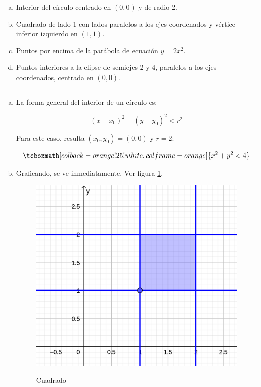 \documentclass{article}
\begin{document}
\begin{enumerate}[(a)]
\bfseries
\item Interior del círculo centrado en $(0, 0)$ y de radio 2.

\item Cuadrado de lado 1 con lados paralelos a los ejes coordenados y vértice inferior izquierdo en $(1, 1)$.

\item Puntos por encima de la parábola de ecuación $y = 2x^2$.

\item Puntos interiores a la elipse de semiejes 2 y 4, paralelos a los ejes coordenados, centrada en $(0, 0)$.

\end{enumerate}
\hrule

\begin{enumerate}[(a)]
\item La forma general del interior de un círculo es:

\begin{equation}
(x-x_0)^2 + (y-y_0)^2 < r^2
\end{equation}

Para este caso, resulta $(x_0, y_0) = (0, 0)$ y $r=2$:

\begin{equation}
\tcboxmath[colback=orange!25!white,colframe=orange]
{ x^2 + y^2 < 4 }
\end{equation}

\item Graficando, se ve inmediatamente. Ver figura \ref{fig:1-12-b}.

\begin{figure}[ht]
\caption{Cuadrado}
\includegraphics[scale=1.4]{img/ejercicios/1/12-b.png} 
\centering
\label{fig:1-12-b}
\end{figure}


\end{enumerate}
\end{document}
